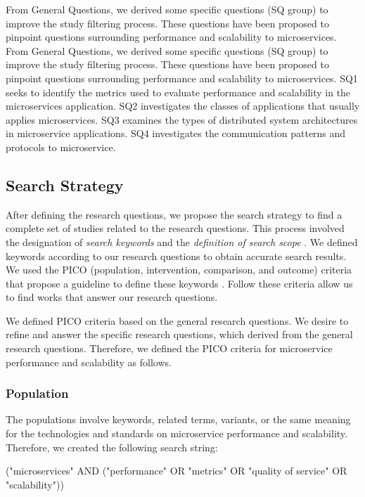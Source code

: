 From General Questions, we derived some specific questions (SQ group) to improve the study filtering process. These questions have been proposed to pinpoint questions surrounding performance and scalability to microservices. From General Questions, we derived some specific questions (SQ group) to improve the study filtering process. These questions have been proposed to pinpoint questions surrounding performance and scalability to microservices. SQ1 seeks to identify the metrics used to evaluate performance and scalability in the microservices application. SQ2 investigates the classes of applications that usually applies microservices. SQ3 examines the types of distributed system architectures in microservice applications. SQ4 investigates the communication patterns and protocols to microservice.

\subsection{Search Strategy}
\label{search}
After defining the research questions, we propose the search strategy to find a complete set of studies related to the research questions. This process involved the designation of \textit{search keywords} and the \textit{definition of search scope} \cite{Petticrew2006SystematicSciences}. We defined keywords according to our research questions to obtain accurate search results. We used the PICO (population, intervention, comparison, and outcome) criteria that propose a guideline to define these keywords \cite{Akobeng2005PrinciplesMedicine.}. Follow these criteria allow us to find works that answer our research questions.

We defined PICO criteria based on the general research questions. We desire to refine and answer the specific research questions, which derived from the general research questions. Therefore, we defined the PICO criteria for microservice performance and scalability as follows.

\subsubsection{Population}
The populations involve keywords, related terms, variants, or the same meaning for the technologies and standards on microservice performance and scalability. Therefore, we created the following search string:

\begin{tcolorbox}[width=\linewidth,title={Search String},colbacktitle=white,coltitle=black]
("microservices" AND ("performance" OR "metrics" OR "quality of service" OR "scalability"))
\end{tcolorbox}

